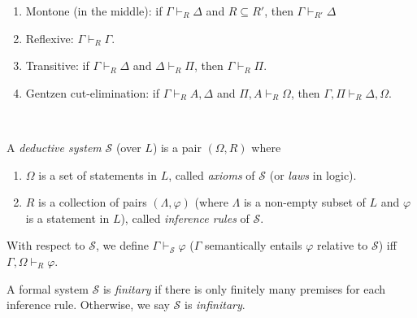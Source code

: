 \documentclass{treatise}
\begin{document}
\begin{shaded}
\begin{proposition}
\begin{enumerate}
    \item Montone (in the middle): if $\Gamma \vdash_R \Delta$ and $R \subseteq R'$, then $\Gamma \vdash_{R'} \Delta$
    \item Reflexive: $\Gamma \vdash_R \Gamma$.
    \item Transitive: if $\Gamma \vdash_R \Delta$ and $\Delta \vdash_R \Pi$, then $\Gamma \vdash_R \Pi$.
    \item Gentzen cut-elimination: if $\Gamma \vdash_R A, \Delta$ and $\Pi, A \vdash_R \Omega$, then $\Gamma, \Pi \vdash_R \Delta, \Omega$.
\end{enumerate}
\end{proposition}
\ \\
\begin{definition}
A \emph{deductive system} $\mathcal{S}$ (over $L$) is a pair $(\Omega, R)$ where
\begin{enumerate}
    \item $\Omega$ is a set of statements in $L$, called \emph{axioms} of $\mathcal{S}$ (or \emph{laws} in logic).
    \item $R$ is a collection of pairs $(\Lambda, \varphi)$ (where $\Lambda$ is a non-empty subset of $L$ and $\varphi$ is a statement in $L$), called \emph{inference rules} of $\mathcal{S}$.
\end{enumerate}
\end{definition}
\begin{definition}
With respect to $\mathcal{S}$, we define $\Gamma \vdash_{\mathcal{S}} \varphi$ ($\Gamma$ semantically entails $\varphi$ relative to $\mathcal{S}$) iff $\Gamma, \Omega \vdash_R \varphi$.
\end{definition}
\begin{definition}
A formal system $\mathcal{S}$ is \emph{finitary} if there is only finitely many premises for each inference rule. Otherwise, we say $\mathcal{S}$ is \emph{infinitary}.
\end{definition}

\newpage


\end{shaded}
\end{document}
